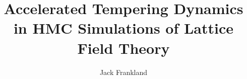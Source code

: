 \documentclass[12pt]{article}
\begin{document}
\title{Accelerated Tempering Dynamics in HMC Simulations of Lattice Field Theory} %
\author{Jack Frankland} %

\begin{abstract}
    
\end{abstract}

\maketitle

\personalstatement



\acknowledgments



\maintext
\end{document}

